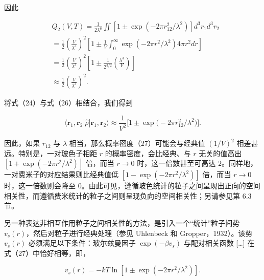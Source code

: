 因此

\begin{equation}\tag{5.4.44}\label{eq:5.4.44}
\begin{array}{rl} & { Q _ { 2 } ( V , T ) = \frac { 1 } { 2 \lambda ^{6} } \iint \left[ 1 \pm \exp { ( - 2 \pi r _ { 12 } ^{2} / \lambda ^{2} ) } \right] d ^{3} r _ { 1 } d ^{3} r _ { 2 } } \\& {  = \frac { 1 } { 2 } \left( \frac { V } { \lambda ^{3} } \right) ^{2} \left[ 1 \pm \frac { 1 } { V } \int _ { 0 } ^{\infty} \exp { ( - 2 \pi r ^{2} / \lambda ^{2} ) } 4 \pi r ^{2} d r \right] } \\& {  = \frac { 1 } { 2 } \left( \frac { V } { \lambda ^{3} } \right) ^{2} \left[ 1 \pm \frac { 1 } { 2 ^{3 / 2} } \left( \frac { \lambda ^{3} } { V } \right) \right] } \\& {  \approx \frac { 1 } { 2 } \left( \frac { V } { \lambda ^{3} } \right) ^{2} . } \end{array}
\end{equation}

将式（24）与式（26）相结合，我们得到

\begin{equation}\tag{5.4.45}\label{eq:5.4.45}
\langle \pmb { r } _ { 1 } , \pmb { r } _ { 2 } | \hat { \rho } | \pmb { r } _ { 1 } , \pmb { r } _ { 2 } \rangle \approx \frac { 1 } { V ^{2} } \big [ 1 \pm \exp \big ( - 2 \pi r _ { 12 } ^{2} / \lambda ^{2} \big ) \big ] .
\end{equation}

因此，如果 \(r_{12}\) 与 \(\lambda\) 相当，那么概率密度（27）可能会与经典值 \((1/V)^2\) 相差甚远。特别是，一对玻色子相距 \(r\) 的概率密度，会比经典、与 \(r\) 无关的值高出 \([1+\exp(-2\pi r^2/\lambda^2)]\) 倍，而当 \(r\to0\) 时，这一倍数甚至可高达 \(2\)。同样地，一对费米子的对应结果则比经典值低 \([1-\exp(-2\pi r^2/\lambda^2)]\) 倍，而当 \(r\to0\) 时，这一倍数则会降至 \(0\)。由此可见，遵循玻色统计的粒子之间呈现出正向的空间相关性，而遵循费米统计的粒子之间则呈现负向的空间相关性；另请参见第 6.3 节。

另一种表达非相互作用粒子之间相关性的方法，是引入一个``统计''粒子间势 \(v_{s}(r)\)，然后对粒子进行经典处理（参见 Uhlenbeck 和 Gropper，1932）。该势 \(v_{s}(r)\) 必须满足以下条件：玻尔兹曼因子 \(\exp(-\beta v_{s})\) 与配对相关函数 {[}\ldots{]} 在式（27）中恰好相等，即，

\begin{equation}\tag{5.4.46}\label{eq:5.4.46}
v _ { s } ( r ) = - k T \ln \left[ 1 \pm \exp \left( - 2 \pi r ^{2} / \lambda ^{2} \right) \right] .
\end{equation}

